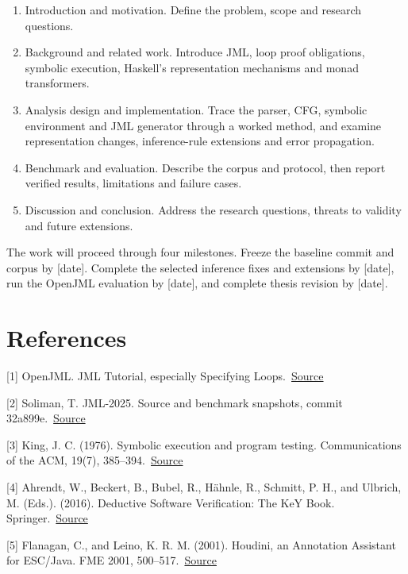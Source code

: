 \documentclass[11pt,a4paper]{article}
\begin{document}
\begin{enumerate}
\item Introduction and motivation. Define the problem, scope and research questions.
\item Background and related work. Introduce JML, loop proof obligations, symbolic execution, Haskell's representation mechanisms and monad transformers.
\item Analysis design and implementation. Trace the parser, CFG, symbolic environment and JML generator through a worked method, and examine representation changes, inference-rule extensions and error propagation.
\item Benchmark and evaluation. Describe the corpus and protocol, then report verified results, limitations and failure cases.
\item Discussion and conclusion. Address the research questions, threats to validity and future extensions.
\end{enumerate}
The work will proceed through four milestones. Freeze the baseline commit and corpus by [date]. Complete the selected inference fixes and extensions by [date], run the OpenJML evaluation by [date], and complete thesis revision by [date].

\section{References}
\begingroup
\setlength{\parskip}{1pt}
{\small [1] OpenJML. JML Tutorial, especially Specifying Loops.\ \href{https://www.openjml.org/tutorial/Loops}{Source}\par}

{\small [2] Soliman, T. JML-2025. Source and benchmark snapshots, commit 32a899e.\ \href{https://github.com/tareksoliman26072020/JML-2025/tree/32a899eabe502f8d795b091f286a096fdf2326f4}{Source}\par}

{\small [3] King, J. C. (1976). Symbolic execution and program testing. Communications of the ACM, 19(7), 385--394.\ \href{https://doi.org/10.1145/360248.360252}{Source}\par}

{\small [4] Ahrendt, W., Beckert, B., Bubel, R., Hähnle, R., Schmitt, P. H., and Ulbrich, M. (Eds.). (2016). Deductive Software Verification: The KeY Book. Springer.\ \href{https://doi.org/10.1007/978-3-319-49812-6}{Source}\par}

{\small [5] Flanagan, C., and Leino, K. R. M. (2001). Houdini, an Annotation Assistant for ESC/Java. FME 2001, 500--517.\ \href{https://doi.org/10.1007/3-540-45251-6_29}{Source}\par}
\end{document}
